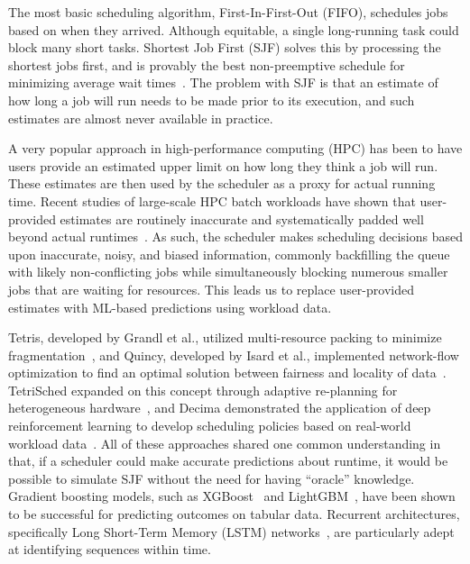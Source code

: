 \clearpage
The most basic scheduling algorithm, First-In-First-Out (FIFO), schedules jobs based on when they arrived. Although equitable, a single long-running task could block many short tasks. Shortest Job First (SJF) solves this by processing the shortest jobs first, and is provably the best non-preemptive schedule for minimizing average wait times~\cite{kleinrock1975queueing}. The problem with SJF is that an estimate of how long a job will run needs to be made prior to its execution, and such estimates are almost never available in practice.

A very popular approach in high-performance computing (HPC) has been to have users provide an estimated upper limit on how long they think a job will run. These estimates are then used by the scheduler as a proxy for actual running time. Recent studies of large-scale HPC batch workloads have shown that user-provided estimates are routinely inaccurate and systematically padded well beyond actual runtimes~\cite{tsafrir2007backfill,mualem2001backfilling,lee2004estimates}. As such, the scheduler makes scheduling decisions based upon inaccurate, noisy, and biased information, commonly backfilling the queue with likely non-conflicting jobs while simultaneously blocking numerous smaller jobs that are waiting for resources. This leads us to replace user-provided estimates with ML-based predictions using workload data.

Tetris, developed by Grandl et al., utilized multi-resource packing to minimize fragmentation~\cite{grandl2014multi}, and Quincy, developed by Isard et al., implemented network-flow optimization to find an optimal solution between fairness and locality of data~\cite{isard2009quincy}. TetriSched expanded on this concept through adaptive re-planning for heterogeneous hardware~\cite{tumanov2016tetrisched}, and Decima demonstrated the application of deep reinforcement learning to develop scheduling policies based on real-world workload data~\cite{mao2019learning}. All of these approaches shared one common understanding in that, if a scheduler could make accurate predictions about runtime, it would be possible to simulate SJF without the need for having ``oracle'' knowledge. Gradient boosting models, such as XGBoost~\cite{chen2016xgboost} and LightGBM~\cite{ke2017lightgbm}, have been shown to be successful for predicting outcomes on tabular data. Recurrent architectures, specifically Long Short-Term Memory (LSTM) networks~\cite{hochreiter1997long}, are particularly adept at identifying sequences within time.

